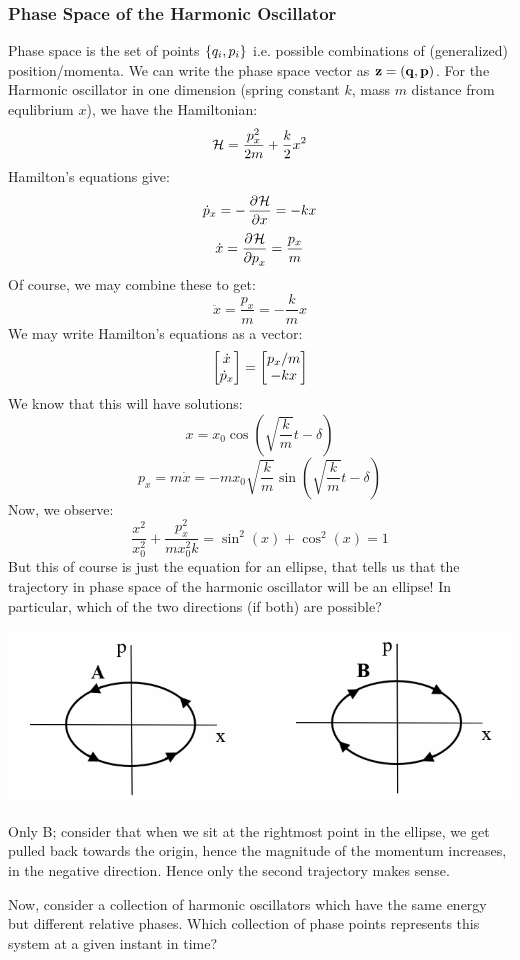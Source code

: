 \documentclass[../PHYS306Notes.tex]{subfiles}
\begin{document}
\subsubsection{Phase Space of the Harmonic Oscillator}
Phase space is the set of points $\set{q_i, p_i}$ i.e. possible combinations of (generalized) position/momenta. We can write the phase space vector as $\mathbf{z} = (\mathbf{q}, \mathbf{p})$. For the Harmonic oscillator in one dimension (spring constant $k$, mass $m$ distance from equlibrium $x$), we have the Hamiltonian:
\[\mathcal{H} = \frac{p_x^2}{2m} + \frac{k}{2}x^2\]
Hamilton's equations give:
\[\dot{p}_x = -\dpd{\HH}{x} = -kx\]
\[\dot{x} = \dpd{\HH}{p_x} = \frac{p_x}{m}\]
Of course, we may combine these to get:
\[\ddot{x} = \frac{p_x}{m} = -\frac{k}{m}x\]
We may write Hamilton's equations as a vector:
\[\begin{bmatrix}\dot{x} \\ \dot{p}_x\end{bmatrix} = \begin{bmatrix}p_x/m \\ -kx\end{bmatrix}\]
We know that this will have solutions:
\[x = x_0\cos(\sqrt{\frac{k}{m}}t - \delta)\]
\[p_x = m\dot{x} = -mx_0\sqrt{\frac{k}{m}}\sin(\sqrt{\frac{k}{m}}t - \delta)\]
Now, we observe:
\[\frac{x^2}{x_0^2} + \frac{p_x^2}{mx_0^2k} = \sin^2(x) + \cos^2(x) = 1\]
But this of course is just the equation for an ellipse, that tells us that the trajectory in phase space of the harmonic oscillator will be an ellipse! In particular, which of the two directions (if both) are possible?
\begin{center}
    \includegraphics[scale=0.8]{Lecture-23/l23-img2.png}
\end{center}
\begin{s}
Only B; consider that when we sit at the rightmost point in the ellipse, we get pulled back towards the origin, hence the magnitude of the momentum increases, in the negative direction. Hence only the second trajectory makes sense. 
\end{s}
Now, consider a collection of harmonic oscillators which have the same energy but different relative phases. Which collection of phase points represents this system at a given instant in time?
\end{document}
